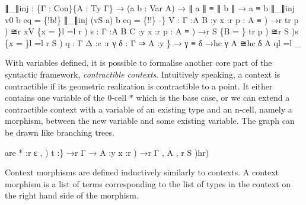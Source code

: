\documentclass{acm_proc_article-sp}
\begin{document}
{\begin{code}
{∥\_∥inj : \{Γ : Con\}\{A : Ty Γ\} → (a b : Var A) → ∥ a ∥ ≡ ∥ b ∥ → a ≡ b
∥\_∥inj v0 b eq = \{!b!\}
∥\_∥inj (vS a) b eq = \{!!\}
-}\}
V : \AgdaBound{\{}Γ :\AgdaBound{\{}A B :y \AgdaBound{\{}x :r \AgdaBound{(}p : A ≡ ) →r tr p ) ≅r xV \{x = \}l =l r )
s : \AgdaBound{\{}Γ :\AgdaBound{\{}A B C :y \AgdaBound{\{}x :r \AgdaBound{(}p : A ≡ ) →r S \{B = \} tr p ) ≅r S )s \{x = \}l =l r S )
q : \AgdaBound{\{}Γ Δ :c :r \AgdaBound{\{}γ δ : Γ ⇒ \AgdaBound{\{}A :y \} → γ ≡ δ →hc γ A ≅hc δ A ql =l \_

\<%
\end{code}
}
With variables defined, it is possible to formalise another core part of the syntactic framework, \emph{contractible
contexts}. Intuitively speaking, a context is contractible if its geometric
realization is contractible to a point. It either contains one variable of the 0-cell $*$ which is the base case, or we can extend a contractible context with a
variable of an existing type and an n-cell, namely a morphism, between the new variable and some existing variable. The graph can be drawn like branching trees.

\begin{code}%
\>are
 *   :r \AgdaInductiveConstructor{(}ε , \AgdaSymbol{*})
 t  :\AgdaBound{\{}\} →r Γ → \AgdaBound{\{}A :y \AgdaBound{(}x :r ) 
       →r \AgdaBound{(}Γ , A , r S )\AgdaInductiveConstructor{ =}hr)     
\<%
\end{code}
Context morphisms are defined inductively similarly to contexts. A context morphism is a list of terms corresponding to the list of types in the context on the right hand side of the morphism.
\end{document}
